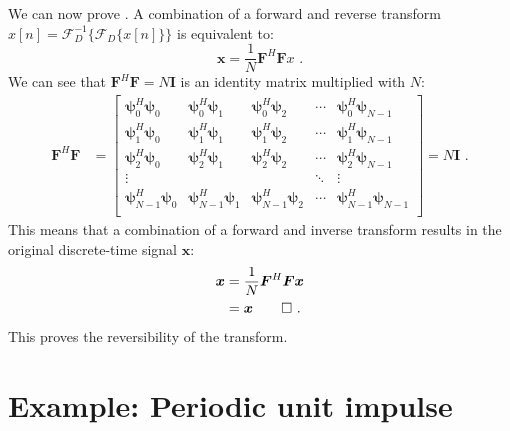 We can now prove . A combination of a forward and reverse transform $x[n]=\mathcal{F}_D^{-1}\{\mathcal{F}_D\{x[n]\}\}$ is equivalent to:
\begin{equation}
\bm{x} = \frac{1}{N}\bm{F}^H \bm{F} x \,\,.
\end{equation}
We can see that $\bm{F}^H \bm{F} = N\bm{I}$ is an identity matrix
multiplied with $N$:
\begin{align}
\bm{F}^H \bm{F} &= \begin{bmatrix}
\bm{\psi}_0^H \bm{\psi}_0 & \bm{\psi}_0^H \bm{\psi}_1 & \bm{\psi}_0^H \bm{\psi}_2 & \cdots & \bm{\psi}_0^H \bm{\psi}_{N-1}\\
\bm{\psi}_1^H \bm{\psi}_0 & \bm{\psi}_1^H \bm{\psi}_1 & \bm{\psi}_1^H \bm{\psi}_2 & \cdots & \bm{\psi}_1^H \bm{\psi}_{N-1}\\
\bm{\psi}_2^H \bm{\psi}_0 & \bm{\psi}_2^H \bm{\psi}_1 & \bm{\psi}_2^H \bm{\psi}_2 & \cdots & \bm{\psi}_2^H \bm{\psi}_{N-1}\\
\vdots                   &                           &                   &    \ddots      & \vdots \\
\bm{\psi}_{N-1}^H \bm{\psi}_0 & \bm{\psi}_{N-1}^H \bm{\psi}_1 & \bm{\psi}_{N-1}^H \bm{\psi}_2 & \cdots & \bm{\psi}_{N-1}^H \bm{\psi}_{N-1}\\
\end{bmatrix}=N\bm{I} \,\,.
\end{align}
This means that a combination of a forward and inverse transform results in the original discrete-time signal $\bm{x}$:
\begin{align}
\bm{x} &= \frac{1}{N}\bm{F}^H \bm{F} \bm{x}\\
       &= \bm{x} \qed \,\,.
\end{align}
This proves the reversibility of the transform.

\section{Example: Periodic unit impulse}

